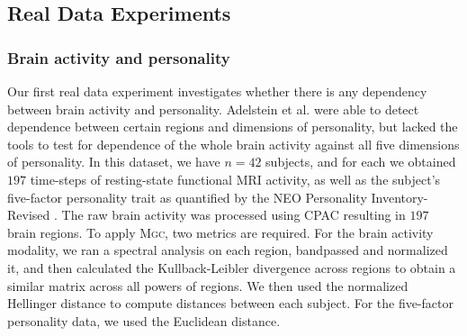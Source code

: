 \documentclass[11pt]{article}
\providecommand{\sct}[1]{{\normalfont\textsc{#1}}}
\newcommand{\Mgc}{\sct{Mgc}}
\begin{document}
\subsection*{Real Data Experiments}
\label{numer3}

\subsubsection*{Brain activity and personality} %
Our first real data experiment investigates whether there is any dependency between  brain activity and personality.
Adelstein et al. \cite{AdelsteinEtAl2011} were able to detect dependence between certain regions and dimensions of personality, but lacked the tools to test for dependence of the whole brain activity against all five dimensions of personality. 
In this dataset, we have $n=42$ subjects, and for each we obtained  $197$ time-steps of resting-state functional MRI activity, as well as the subject's five-factor personality trait as quantified by  the NEO Personality Inventory-Revised  \cite{Costa1992}. 
The raw brain activity was processed using CPAC \cite{CPAC2015} resulting in $197$ brain regions.
To apply \Mgc, two metrics are required. For the brain activity modality, we ran a spectral analysis on each region, bandpassed and normalized it, and then calculated the Kullback-Leibler divergence across regions to obtain a similar matrix across all powers of regions.  We then used  the normalized Hellinger distance to compute distances between each subject. 
For the five-factor personality data, we  used the Euclidean distance.


\end{document}

